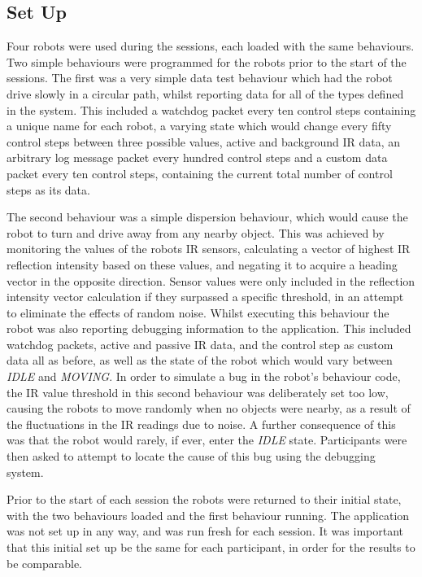 \subsection{Set Up}
Four robots were used during the sessions, each loaded with the same behaviours. Two simple behaviours were programmed for the robots prior to the start of the sessions. The first was a very simple data test behaviour which had the robot drive slowly in a circular path, whilst reporting data for all of the types defined in the system. This included a watchdog packet every ten control steps containing a unique name for each robot, a varying state which would change every fifty control steps between three possible values, active and background IR data, an arbitrary log message packet every hundred control steps and a custom data packet every ten control steps, containing the current total number of control steps as its data. 

The second behaviour was a simple dispersion behaviour, which would cause the robot to turn and drive away from any nearby object. This was achieved by monitoring the values of the robots IR sensors, calculating a vector of highest IR reflection intensity based on these values, and negating it to acquire a heading vector in the opposite direction. Sensor values were only included in the reflection intensity vector calculation if they surpassed a specific threshold, in an attempt to eliminate the effects of random noise. Whilst executing this behaviour the robot was also reporting debugging information to the application. This included watchdog packets, active and passive IR data, and the control step as custom data all as before, as well as the state of the robot which would vary between \textit{IDLE} and \textit{MOVING}. In order to simulate a bug in the robot's behaviour code, the IR value threshold in this second behaviour was deliberately set too low, causing the robots to move randomly when no objects were nearby, as a result of the fluctuations in the IR readings due to noise. A further consequence of this was that the robot would rarely, if ever, enter the \textit{IDLE} state. Participants were then asked to attempt to locate the cause of this bug using the debugging system.

Prior to the start of each session the robots were returned to their initial state, with the two behaviours loaded and the first behaviour running. The application was not set up in any way, and was run fresh for each session. It was important that this initial set up be the same for each participant, in order for the results to be comparable.

